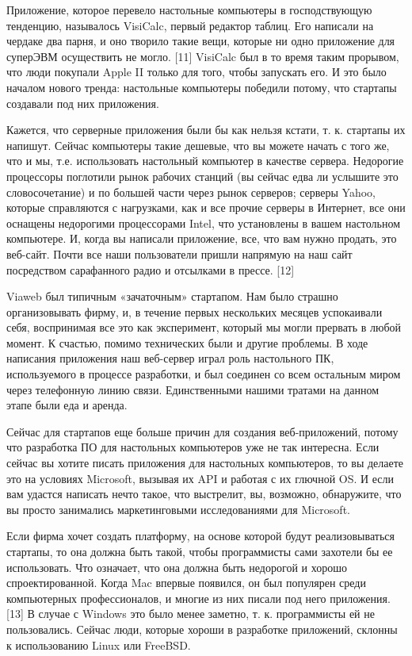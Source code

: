 \documentclass[ebook,12pt,oneside,openany]{memoir}
\begin{document}
Приложение, которое перевело настольные компьютеры в господствующую
тенденцию, называлось VisiCalc, первый редактор таблиц. Его написали
на чердаке два парня, и оно творило такие вещи, которые ни одно
приложение для суперЭВМ осуществить не могло. [11] VisiCalc был в то
время таким прорывом, что люди покупали Apple II только для того,
чтобы запускать его. И это было началом нового тренда: настольные
компьютеры победили потому, что стартапы создавали под них приложения.

Кажется, что серверные приложения были бы как нельзя кстати, т. к.
стартапы их напишут. Сейчас компьютеры такие дешевые, что вы можете
начать с того же, что и мы, т.е. использовать настольный компьютер в
качестве сервера. Недорогие процессоры поглотили рынок рабочих станций
(вы сейчас едва ли услышите это словосочетание) и по большей части
через рынок серверов; серверы Yahoo, которые справляются с нагрузками,
как и все прочие серверы в Интернет, все они оснащены недорогими
процессорами Intel, что установлены в вашем настольном компьютере. И,
когда вы написали приложение, все, что вам нужно продать, это
веб-сайт. Почти все наши пользователи пришли напрямую на наш сайт
посредством сарафанного радио и отсылками в прессе. [12]

Viaweb был типичным «зачаточным» стартапом. Нам было страшно
организовывать фирму, и, в течение первых нескольких месяцев
успокаивали себя, воспринимая все это как эксперимент, который мы
могли прервать в любой момент. К счастью, помимо технических были и
другие проблемы. В ходе написания приложения наш веб-сервер играл роль
настольного ПК, используемого в процессе разработки, и был соединен со
всем остальным миром через телефонную линию связи. Единственными
нашими тратами на данном этапе были еда и аренда.

Сейчас для стартапов еще больше причин для создания веб-приложений,
потому что разработка ПО для настольных компьютеров уже не так
интересна. Если сейчас вы хотите писать приложения для настольных
компьютеров, то вы делаете это на условиях Microsoft, вызывая их API и
работая с их глючной OS. И если вам удастся написать нечто такое, что
выстрелит, вы, возможно, обнаружите, что вы просто занимались
маркетинговыми исследованиями для Microsoft.

Если фирма хочет создать платформу, на основе которой будут
реализовываться стартапы, то она должна быть такой, чтобы программисты
сами захотели бы ее использовать. Что означает, что она должна быть
недорогой и хорошо спроектированной. Когда Mac впервые появился, он
был популярен среди компьютерных профессионалов, и многие из них
писали под него приложения. [13] В случае с Windows это было менее
заметно, т. к. программисты ей не пользовались. Сейчас люди, которые
хороши в разработке приложений, склонны к использованию Linux или
FreeBSD.
\end{document}
